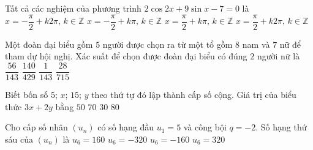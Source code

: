\begin{ex}%
	Tất cả các nghiệm của phương trình $2\cos 2x+9\sin x-7=0$ là
	\choice
	{$x=-\dfrac{\pi}{2}+k2\pi,\,k\in \mathbb{Z}$}
	{$x=-\dfrac{\pi}{2}+k\pi,\,k\in \mathbb{Z}$}
	{$x=\dfrac{\pi}{2}+k\pi,\,k\in \mathbb{Z}$}
	{\True $x=\dfrac{\pi}{2}+k2\pi,\,k\in \mathbb{Z}$}
	\loigiai{
		$\begin{aligned}\text{Ta có } 2\cos 2x+9\sin x-7=0 &\Leftrightarrow -4\sin^2x+9\sin x-5=0\\
		&\Leftrightarrow \left[\begin{aligned}
		&\sin x=\dfrac{5}{4}\ (\text{vô nghiệm}) \\
		&\sin x=1
		\end{aligned}\right. \Leftrightarrow x=\dfrac{\pi}{2}+k2\pi,\,k\in \mathbb{Z}.
		\end{aligned}$}
\end{ex}

\begin{ex}%
	Một đoàn đại biểu gồm $5$ người được chọn ra từ một tổ gồm $8$ nam và $7$ nữ để tham dự hội nghị. Xác suất để chọn được đoàn đại biểu có đúng $2$ người nữ là
	\choice
	{\True $\dfrac{56}{143}$}
	{$\dfrac{140}{429}$}
	{$\dfrac{1}{143}$}
	{$\dfrac{28}{715}$}
\end{ex}

\begin{ex}%
	Biết bốn số $5$; $x$; $15$; $y$ theo thứ tự đó lập thành cấp số cộng. Giá trị của biểu thức $3x+2y$ bằng
	\choice
	{$50$}
	{\True $70$}
	{$30$}
	{$80$}
\end{ex}

\begin{ex}%
	Cho cấp số nhân $(u_n)$ có số hạng đầu $u_1=5$ và công bội $q=-2$. Số hạng thứ sáu của $(u_n)$ là
	\choice
	{$u_6=160$}
	{$u_6=-320$}
	{\True $u_6=-160$}
	{$u_6=320$}
\end{ex}

